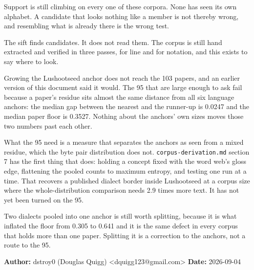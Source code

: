 Support is still climbing on every one of these corpora. None has seen its own alphabet. A candidate that looks nothing like a member is not thereby wrong, and resembling what is already there is the wrong test.

The sift finds candidates. It does not read them. The corpus is still hand extracted and verified in three passes, for line and for notation, and this exists to say where to look.

Growing the Lushootseed anchor does not reach the 103 papers, and an earlier version of this document said it would. The 95 that are large enough to ask fail because a paper's residue sits almost the same distance from all six language anchors: the median gap between the nearest and the runner-up is 0.0247 and the median paper floor is 0.3527. Nothing about the anchors' own sizes moves those two numbers past each other.

What the 95 need is a measure that separates the anchors as seen from a mixed residue, which the byte pair distribution does not. \texttt{corpus-\allowbreak{}derivation.\allowbreak{}md} section 7 has the first thing that does: holding a concept fixed with the word web's gloss edge, flattening the pooled counts to maximum entropy, and testing one run at a time. That recovers a published dialect border inside Lushootseed at a corpus size where the whole-distribution comparison needs 2.9 times more text. It has not yet been turned on the 95.

Two dialects pooled into one anchor is still worth splitting, because it is what inflated the floor from 0.305 to 0.641 and it is the same defect in every corpus that holds more than one paper. Splitting it is a correction to the anchors, not a route to the 95.

\textbf{Author:} dstroy0 (Douglas Quigg) <dquigg123@gmail.com> \textbf{Date:} 2026-09-04

